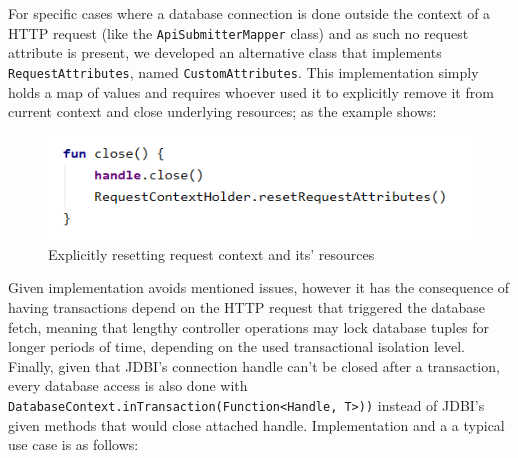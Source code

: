 For specific cases where a database connection is done outside the context of a HTTP request (like the \texttt{ApiSubmitterMapper} class)
and as such no request attribute is present, we developed an alternative class that implements \texttt{RequestAttributes}, named \texttt{CustomAttributes}.
This implementation simply holds a map of values and requires whoever used it to explicitly remove it from current context and close underlying resources;
as the example shows:\\

\begin{figure}[H]
    \begin{center}
        \includegraphics[scale=0.8]{_figures/Explicitly resetting request context and its' resources.png}
        \caption{Explicitly resetting request context and its' resources}
    \end{center}
\end{figure}

Given implementation avoids mentioned issues, however it has the consequence of having transactions depend on the HTTP request that triggered the database fetch,
meaning that lengthy controller operations may lock database tuples for longer periods of time, depending on the used transactional isolation level.\\

Finally, given that JDBI’s connection handle can’t be closed after a transaction, every database access is also
done with \texttt{DatabaseContext.inTransaction(Function<Handle, T>))} instead of JDBI’s given methods that would close attached handle.
Implementation and a a typical use case is as follows:\\

